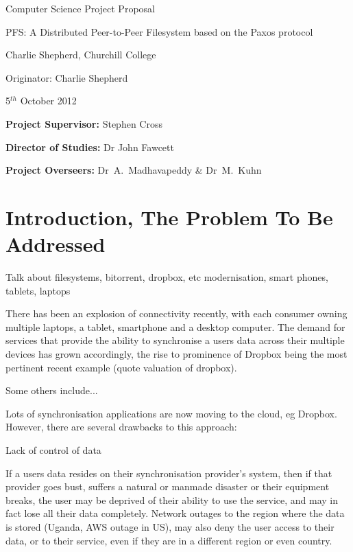 \vfil

\centerline{\Large Computer Science Project Proposal}
\vspace{0.4in}
\centerline{\Large PFS: A Distributed Peer-to-Peer Filesystem based on the Paxos protocol}
\vspace{0.4in}
\centerline{\large Charlie Shepherd, Churchill College}
\vspace{0.3in}
\centerline{\large Originator: Charlie Shepherd}
\vspace{0.3in}
\centerline{\large 5$^{th}$ October 2012}

\vfil


\noindent
{\bf Project Supervisor:} Stephen Cross
\vspace{0.2in}

\noindent
{\bf Director of Studies:} Dr John Fawcett
\vspace{0.2in}
\noindent

\noindent
{\bf Project Overseers:} Dr~A.~Madhavapeddy \& Dr~M.~Kuhn



\section*{Introduction, The Problem To Be Addressed}

Talk about filesystems, bitorrent, dropbox, etc
modernisation, smart phones, tablets, laptops

There has been an explosion of connectivity recently, with each consumer owning multiple
laptops, a tablet, smartphone and a desktop computer. The demand for services that provide the
ability to synchronise a users data across their multiple devices has grown accordingly, the rise
to prominence of Dropbox being the most pertinent recent example (quote valuation of dropbox).

Some others include...

Lots of synchronisation applications are now moving to the cloud, eg Dropbox. However, there are
several drawbacks to this approach:

Lack of control of data

If a users data resides on their synchronisation provider's system, then if that provider goes
bust, suffers a natural or manmade disaster or their equipment breaks, the user may be deprived of
their ability to use the service, and may in fact lose all their data completely. Network outages
to the region where the data is stored (Uganda, AWS outage in US), may also deny the user access
to their data, or to their service, even if they are in a different region or even country.

